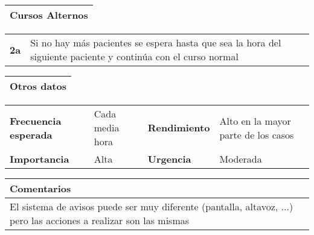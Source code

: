 \documentclass[11pt,a4paper]{article}
\begin{document}
\begin{table}[H]
	\begin{tabularx}{\textwidth}{X}
	  \textbf{Cursos Alternos}\\ \hline
	\end{tabularx}
	\begin{tabularx}{\textwidth}{cX}
		\textbf{2a} & Si no hay más pacientes se espera hasta que sea la hora del siguiente paciente y continúa con el curso normal\\
	\end{tabularx}
\end{table}

\begin{table}[H]
	\begin{tabularx}{\textwidth}{X}
		\textbf{Otros datos}\\ \hline
	\end{tabularx}
	\begin{tabularx}{\textwidth}{lXlX}
		\textbf{Frecuencia esperada} & Cada media hora & \textbf{Rendimiento} & Alto en la mayor parte de los casos\\
		\textbf{Importancia} & Alta & \textbf{Urgencia} & Moderada\\
	\end{tabularx}
	
	\begin{tabularx}{\textwidth}{X}
		\textbf{Comentarios}\\ \hline
		El sistema de avisos puede ser muy diferente (pantalla, altavoz, ...) pero las acciones a realizar son las mismas
	\end{tabularx}
\end{table}


\end{document}
